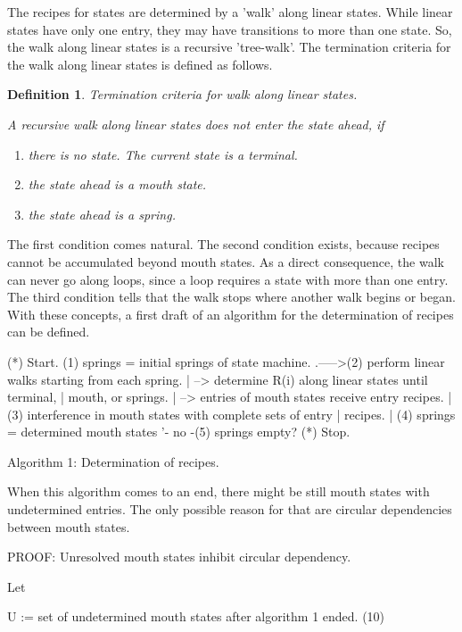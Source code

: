 \documentclass[12pt]{article}
\newtheorem{definition}{Definition}
\begin{document}
The recipes for states are determined by a 'walk' along linear states. While
linear states have only one entry, they may have transitions to more than one
state. So, the walk along linear states is a recursive 'tree-walk'. The
termination criteria for the walk along linear states is defined as follows.

\begin{definition}
Termination criteria for walk along linear states.

A recursive walk along linear states does not enter the
state ahead, if 

\begin{enumerate}
    \item there is no state. The current state is a terminal.
    \item the state ahead is a mouth state.
    \item the state ahead is a spring.
\end{enumerate}
\end{definition}

The first condition comes natural. The second condition exists, because recipes
cannot be accumulated beyond mouth states. As a direct consequence, the walk
can never go along loops, since a loop requires a state with more than one
entry. The third condition tells that the walk stops where another walk begins
or began.  With these concepts, a first draft of an algorithm for the
determination of recipes can be defined.

          (*) Start.
          (1) springs = initial springs of state machine.
   .----->(2) perform linear walks starting from each spring.
   |          --> determine R(i) along linear states until terminal,
   |              mouth, or springs.
   |          --> entries of mouth states receive entry recipes.
   |      (3) interference in mouth states with complete sets of entry
   |          recipes.
   |      (4) springs = determined mouth states
   '- no -(5) springs empty?
          (*) Stop.

        Algorithm 1: Determination of recipes.

When this algorithm comes to an end, there might be still mouth states with
undetermined entries. The only possible reason for that are circular
dependencies between mouth states. 

PROOF: Unresolved mouth states inhibit circular dependency.

Let 

        U := set of undetermined mouth states after algorithm 1 ended.       (10)
\end{document}
